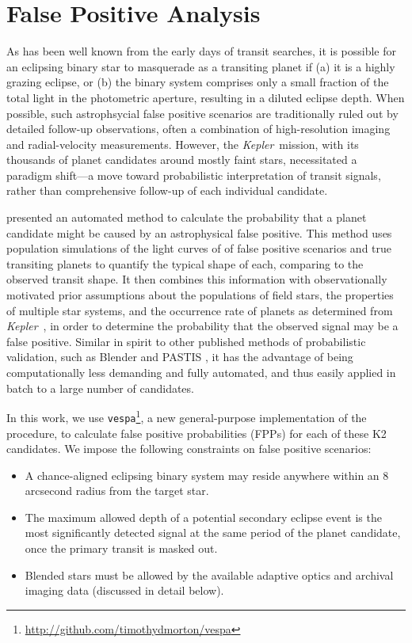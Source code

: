 \documentclass{emulateapj}
\newcommand{\project}[1]{\textsl{#1}}
\newcommand{\kep}{\project{Kepler}}
\begin{document}
\section{False Positive Analysis}

As has been well known from the early days of transit searches, it is
possible for an eclipsing binary star to masquerade as a transiting
planet if (a) it is a highly grazing eclipse, or (b) the binary system
comprises only a small fraction of the total light in the photometric
aperture, resulting in a diluted eclipse depth.
When possible, such astrophsycial false positive scenarios are traditionally
ruled out by detailed follow-up observations, often a combination of 
high-resolution imaging and radial-velocity measurements.
However, the \kep\ mission, with its thousands of planet candidates
around mostly faint stars, necessitated a paradigm shift---a move
toward probabilistic interpretation of transit signals, rather than
comprehensive follow-up of each individual candidate.

\citet{Morton12} presented an automated method to calculate the
probability that a planet candidate might be caused by an
astrophysical false positive.
This method uses population simulations of the light curves of
of false positive scenarios and true transiting planets to quantify
the typical shape of each, comparing to the observed transit shape.
It then combines this information with observationally motivated prior
assumptions about the populations of field stars, the properties of
multiple star systems, and the occurrence rate of planets as determined
from \kep\ \citep{Fressin13}, in order to determine the probability that
the observed signal may be a false positive.
Similar in spirit to other published methods of
probabilistic validation, such as Blender \citep{} and PASTIS
\citep{}, it has the advantage of being computationally less demanding
and fully automated, and thus easily applied in batch to a large
number of candidates.

In this work, we use
\texttt{vespa}\footnote{\url{http://github.com/timothydmorton/vespa}},
a new general-purpose implementation of the \citet{Morton12} procedure, 
to calculate false positive probabilities (FPPs) for each of these 
K2 candidates.  We impose the following constraints on false positive
scenarios:
\begin{itemize}
\item A chance-aligned eclipsing binary system may reside anywhere within
an 8 arcsecond radius from the target star.
\item The maximum allowed depth of a potential secondary eclipse event
is the most significantly detected signal at the same
period of the planet candidate, once the primary transit is masked out.
\item Blended stars must be allowed by the available adaptive optics
and archival imaging data (discussed in detail below).
\end{itemize}
\end{document}
